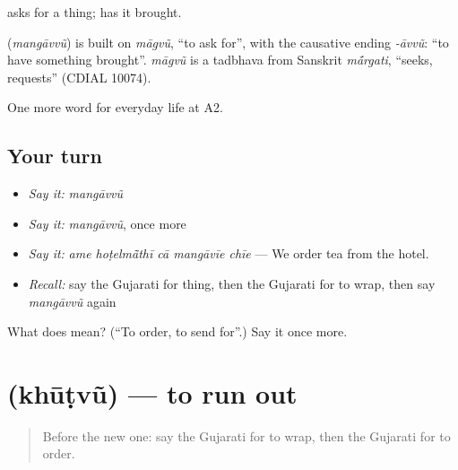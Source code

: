\textbf{} asks for a thing; \textbf{} has it brought.

\begin{cousinweb}
\textbf{} (\emph{mangāvvũ}) is built on \emph{māgvũ}, \textquotedblleft{}to ask for\textquotedblright{}, with the causative ending \emph{-āvvũ}: \textquotedblleft{}to have something brought\textquotedblright{}. \emph{māgvũ} is a tadbhava from Sanskrit \emph{m\'{\={a}}rgati}, \textquotedblleft{}seeks, requests\textquotedblright{} (CDIAL 10074).
\end{cousinweb}

\begin{grammarlens}[title={What you've built}]
One more word for everyday life at A2.
\end{grammarlens}

\subsection*{Your turn}
\begin{itemize}
\raggedright
  \item \emph{Say it:} \emph{mangāvvũ}
  \item \emph{Say it:} \emph{mangāvvũ}, once more
  \item \emph{Say it:} \emph{ame hoṭelmā̃thī cā mangāvīe chīe} — We order tea from the hotel.
  \item \emph{Recall:} say the Gujarati for thing, then the Gujarati for to wrap, then say \emph{mangāvvũ} again
\end{itemize}

\begin{tcolorbox}[breakable,colback=teal!4,colframe=teal!35!black,title={Before you move on}]
What does  mean? (\textquotedblleft{}To order, to send for\textquotedblright{}.) Say it once more.
\end{tcolorbox}
\section[\texorpdfstring{\gu{ખૂટવું} (khūṭvũ)}{ખૂટવું (khūṭvũ)}]{ (khūṭvũ) — to run out}

\label{lesson:GU-C189-khutvu}



\begin{quote}
Before the new one: say the Gujarati for to wrap, then the Gujarati for to order.
\end{quote}

